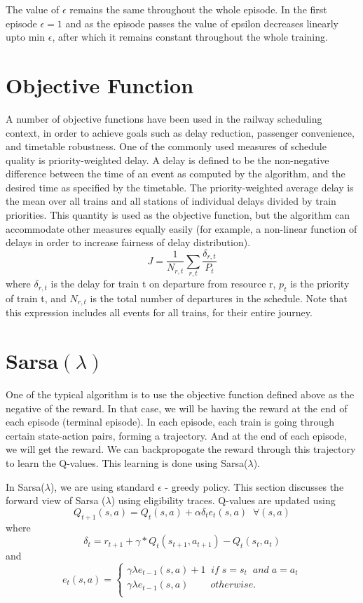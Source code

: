 \vspace{\baselineskip}

The value of $\epsilon$ remains the same throughout the whole episode. In the first episode 
$\epsilon = 1$ and as the episode passes the value of epsilon decreases linearly upto min $\epsilon$,
after which it remains constant throughout the whole training.

\section{Objective Function}
A number of objective functions have been used in the
railway scheduling context, in order to achieve goals such
as delay reduction, passenger convenience, and timetable
robustness. One of the commonly used measures of
schedule quality is priority-weighted delay. A delay is
defined to be the non-negative difference between the time
of an event as computed by the algorithm, and the desired
time as specified by the timetable. The priority-weighted
average delay is the mean over all trains and all stations
of individual delays divided by train priorities. This quantity
is used as the objective function, but the algorithm can
accommodate other measures equally easily (for example,
a non-linear function of delays in order to increase fairness
of delay distribution).
$$ J = \frac{1}{N_{r,t}} \sum_{r,t} \frac{\delta_{r,t}}{P_t} $$
where $\delta_{r,t}$ is the delay for train t on departure from resource r,
$p_t$ is the priority of train t, and $N_{r,t}$ is the total number of
departures in the schedule. Note that this expression includes
all events for all trains, for their entire journey.

\section{Sarsa$(\lambda)$}
One of the typical algorithm is to use the objective function defined above as the negative of the reward. 
In that case, we will be having the reward at the end of each episode (terminal episode).
In each episode, each train is going through certain state-action pairs, forming a trajectory. And at the end
of each episode, we will get the reward. We can backpropogate the reward through this trajectory to learn
the Q-values. This learning is done using Sarsa($\lambda$).

\vspace{\baselineskip}
In Sarsa($\lambda$), we are using standard $\epsilon$ - greedy policy. This section discusses the forward view of 
Sarsa ($\lambda$) using eligibility traces. Q-values are updated using 
$$ Q_{t+1}(s,a) = Q_t(s,a) + \alpha\delta_te_t(s,a)  \;\; \forall(s,a)$$ 
where 
$$\delta_t = r_{t+1} + \gamma*Q_t(s_{t+1} , a_{t+1}) - Q_t(s_t ,a_t)$$
and 
\[
    e_t(s,a)=\left\{
                \begin{array}{ll}
                  \gamma\lambda e_{t-1}(s,a) + 1 \;\; if \; s=s_t \;\; and \; a=a_t\\
                  \gamma\lambda e_{t-1}(s,a) \;\;\;\;\;\;\;\; otherwise.\\
                \end{array}
              \right.
\]

